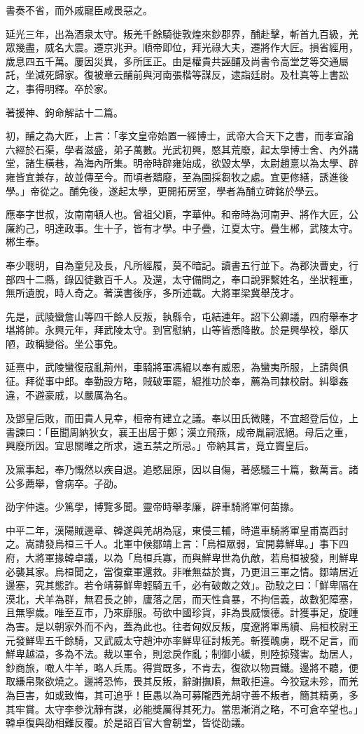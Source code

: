 \begin{pinyinscope}
書奏不省，而外戚寵臣咸畏惡之。

延光三年，出為酒泉太守。叛羌千餘騎徙敦煌來鈔郡界，酺赴擊，斬首九百級，羌眾幾盡，威名大震。遷京兆尹。順帝即位，拜光祿大夫，遷將作大匠。損省經用，歲息四五千萬。屢因災異，多所匡正。由是權貴共誣酺及尚書令高堂芝等交通屬託，坐減死歸家。復被章云酺前與河南張楷等謀反，逮詣廷尉。及杜真等上書訟之，事得明釋。卒於家。

著援神、鉤命解詁十二篇。

初，酺之為大匠，上言：「孝文皇帝始置一經博士，武帝大合天下之書，而孝宣論六經於石渠，學者滋盛，弟子萬數。光武初興，愍其荒廢，起太學博士舍、內外講堂，諸生橫巷，為海內所集。明帝時辟雍始成，欲毀太學，太尉趙憙以為太學、辟雍皆宜兼存，故並傳至今。而頃者穨廢，至為園採芻牧之處。宜更修繕，誘進後學。」帝從之。酺免後，遂起太學，更開拓房室，學者為酺立碑銘於學云。

應奉字世叔，汝南南頓人也。曾祖父順，字華仲。和帝時為河南尹、將作大匠，公廉約己，明達政事。生十子，皆有才學。中子疊，江夏太守。疊生郴，武陵太守。郴生奉。

奉少聰明，自為童兒及長，凡所經履，莫不暗記。讀書五行並下。為郡決曹史，行部四十二縣，錄囚徒數百千人。及還，太守備問之，奉口說罪繫姓名，坐狀輕重，無所遺脫，時人奇之。著漢書後序，多所述載。大將軍梁冀舉茂才。

先是，武陵蠻詹山等四千餘人反叛，執縣令，屯結連年。詔下公卿議，四府舉奉才堪將帥。永興元年，拜武陵太守。到官慰納，山等皆悉降散。於是興學校，舉仄陋，政稱變俗。坐公事免。

延熹中，武陵蠻復寇亂荊州，車騎將軍馮緄以奉有威恩，為蠻夷所服，上請與俱征。拜從事中郎。奉勤設方略，賊破軍罷，緄推功於奉，薦為司隸校尉。糾舉姦違，不避豪戚，以嚴厲為名。

及鄧皇后敗，而田貴人見幸，桓帝有建立之議。奉以田氏微賤，不宜超登后位，上書諫曰：「臣聞周納狄女，襄王出居于鄭；漢立飛燕，成帝胤嗣泯絕。母后之重，興廢所因。宜思關睢之所求，遠五禁之所忌。」帝納其言，竟立竇皇后。

及黨事起，奉乃慨然以疾自退。追愍屈原，因以自傷，著感騷三十篇，數萬言。諸公多薦舉，會病卒。子劭。

劭字仲遠。少篤學，博覽多聞。靈帝時舉孝廉，辟車騎將軍何苗掾。

中平二年，漢陽賊邊章、韓遂與羌胡為寇，東侵三輔，時遣車騎將軍皇甫嵩西討之。嵩請發烏桓三千人。北軍中候鄒靖上言：「烏桓眾弱，宜開募鮮卑。」事下四府，大將軍掾韓卓議，以為「烏桓兵寡，而與鮮卑世為仇敵，若烏桓被發，則鮮卑必襲其家。烏桓聞之，當復棄軍還救。非唯無益於實，乃更沮三軍之情。鄒靖居近邊塞，究其態詐。若令靖募鮮卑輕騎五千，必有破敵之效」。劭駮之曰：「鮮卑隔在漠北，犬羊為群，無君長之帥，廬落之居，而天性貪暴，不拘信義，故數犯障塞，且無寧歲。唯至互巿，乃來靡服。苟欲中國珍貨，非為畏威懷德。計獲事足，旋踵為害。是以朝家外而不內，蓋為此也。往者匈奴反叛，度遼將軍馬續、烏桓校尉王元發鮮卑五千餘騎，又武威太守趙沖亦率鮮卑征討叛羌。斬獲醜虜，既不足言，而鮮卑越溢，多為不法。裁以軍令，則忿戾作亂；制御小緩，則陸掠殘害。劫居人，鈔商旅，噉人牛羊，略人兵馬。得賞既多，不肯去，復欲以物買鐵。邊將不聽，便取縑帛聚欲燒之。邊將恐怖，畏其反叛，辭謝撫順，無敢拒違。今狡寇未殄，而羌為巨害，如或致悔，其可追乎！臣愚以為可募隴西羌胡守善不叛者，簡其精勇，多其牢賞。太守李參沈靜有謀，必能獎厲得其死力。當思漸消之略，不可倉卒望也。」韓卓復與劭相難反覆。於是詔百官大會朝堂，皆從劭議。


\end{pinyinscope}
